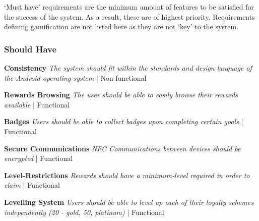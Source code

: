 `Must have' requirements are the minimum amount of features to be satisfied for the success of the system. As a result, these are of highest priority. Requirements defining gamification are not listed here as they are not `key' to the system.

\subsubsection{Should Have}
\begin{description}[leftmargin=!,labelwidth=\widthof{\bfseries Medium}]
    \item[S1] \textbf{Consistency} \newline
        \textit{The system should fit within the standards and design language of the Android operating system}  | Non-functional
        
    \item[S2] \textbf{Rewards Browsing} \newline
        \textit{The user should be able to easily browse their rewards available}  | Functional

    \item[S3] \textbf{Badges} \newline
        \textit{Users should be able to collect badges upon completing certain goals}  | Functional

    \item[S4] \textbf{Secure Communications} \newline
        \textit{NFC Communications between devices should be encrypted}  | Functional

    \item[S5] \textbf{Level-Restrictions} \newline
        \textit{Rewards should have a minimum-level required in order to claim}  | Functional

    \item[S6] \textbf{Levelling System} \newline
        \textit{Users should be able to level up each of their loyalty schemes independently (20 - gold, 50, platinum)}  | Functional
        
\end{description}

